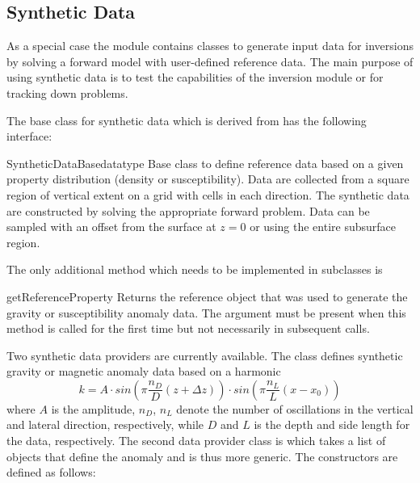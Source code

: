 \subsection{Synthetic Data}
As a special case the  module contains
classes to generate input data for inversions by solving a forward model with
user-defined reference data.
The main purpose of using synthetic data is to test the capabilities of the
inversion module or for tracking down problems.

The base class for synthetic data which is derived from 
has the following interface:

\begin{classdesc}{SyntheticDataBase}{datatype%
}
Base class to define reference data based on a given property distribution
(density or susceptibility). Data are collected from a square region of
vertical extent  on a grid with 
cells in each direction.
The synthetic data are constructed by solving the appropriate forward problem.
Data can be sampled with an offset from the surface at $z=0$ or using the
entire subsurface region.
\end{classdesc}

\vspace{1em}\noindent The only additional method which needs to be implemented
in subclasses is
\begin{methoddesc}[SyntheticDataBase]{getReferenceProperty}{
}
Returns the reference \Data object that was used to generate the gravity or
susceptibility anomaly data. The  argument must be present
when this method is called for the first time but not necessarily in
subsequent calls.
\end{methoddesc}

\vspace{1em}\noindent Two synthetic data providers are currently available.
The class  defines synthetic gravity or magnetic anomaly
data based on a harmonic
\begin{equation}\label{eq:synthdata}
    k=A\cdot sin\left(\pi \frac{n_D}{D} (z+\Delta z)\right) \cdot%
        sin\left(\pi \frac{n_L}{L} (x - x_0)\right)
\end{equation}
where $A$ is the amplitude, $n_D$, $n_L$ denote the number of oscillations in
the vertical and lateral direction, respectively, while $D$ and $L$ is the
depth and side length for the data, respectively.
The second data provider class is  which takes a
list of  objects that define the anomaly and is thus more
generic.
The constructors are defined as follows:

